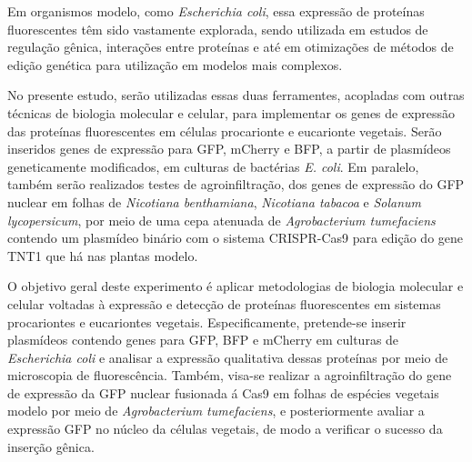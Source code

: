 Em organismos modelo, como \textit{Escherichia coli}, essa expressão de
proteínas fluorescentes têm sido vastamente explorada, sendo utilizada em
estudos de regulação gênica, interações entre proteínas e até em otimizações de
métodos de edição genética para utilização em modelos mais
complexos\cite{ruiz_silhavy_2022}. 

No presente estudo, serão utilizadas essas duas ferramentes, acopladas com
outras técnicas de biologia molecular e celular, para implementar os genes de
expressão das proteínas fluorescentes em células procarionte e eucarionte
vegetais. Serão inseridos genes de expressão para GFP, mCherry e BFP, a partir
de plasmídeos geneticamente modificados, em culturas de bactérias \textit{E.
coli}. Em paralelo, também serão realizados testes de agroinfiltração, dos genes
de expressão do GFP nuclear em folhas de \textit{Nicotiana benthamiana},
\textit{Nicotiana tabacoa} e \textit{Solanum lycopersicum}, por meio de uma cepa
atenuada de \textit{Agrobacterium tumefaciens} contendo um plasmídeo binário com
o sistema CRISPR-Cas9 para edição do gene TNT1 que há nas plantas
modelo\cite{hernández-pinzón_2012}.

O objetivo geral deste experimento é aplicar metodologias de biologia molecular
e celular voltadas à expressão e detecção de proteínas fluorescentes em sistemas
procariontes e eucariontes vegetais. Especificamente, pretende-se inserir
plasmídeos contendo genes para GFP, BFP e mCherry em culturas de
\textit{Escherichia coli}  e analisar a expressão qualitativa dessas proteínas
por meio de microscopia de fluorescência. Também, visa-se realizar a
agroinfiltração do gene de expressão da GFP nuclear fusionada á Cas9 em folhas
de espécies vegetais modelo por meio de \textit{Agrobacterium tumefaciens}, e
posteriormente avaliar a expressão GFP no núcleo da células vegetais, de modo a
verificar o sucesso da inserção gênica. 
